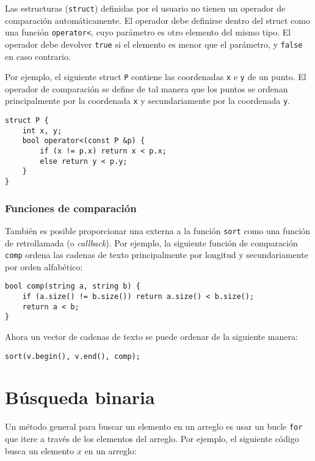 Las estructuras (\texttt{struct}) definidas por el usuario
no tienen un operador de comparación
automáticamente.
El operador debe definirse dentro
del struct como una función
\texttt{operator<},
cuyo parámetro es otro elemento del mismo tipo.
El operador debe devolver \texttt{true}
si el elemento es menor que el parámetro,
y \texttt{false} en caso contrario.

Por ejemplo, el siguiente struct \texttt{P}
contiene las coordenadas \texttt{x} e \texttt{y} de un punto.
El operador de comparación se define de tal manera que
los puntos se ordenan principalmente por la coordenada \texttt{x}
y secundariamente por la coordenada \texttt{y}.

\begin{lstlisting}
struct P {
    int x, y;
    bool operator<(const P &p) {
        if (x != p.x) return x < p.x;
        else return y < p.y;
    }
}
\end{lstlisting}

\subsubsection{Funciones de comparación}


También es posible proporcionar una
 externa a la función \texttt{sort}
como una función de retrollamada (o \textit{callback}).
Por ejemplo, la siguiente función de comparación \texttt{comp}
ordena las cadenas de texto principalmente por longitud y secundariamente
por orden alfabético:

\begin{lstlisting}
bool comp(string a, string b) {
    if (a.size() != b.size()) return a.size() < b.size();
    return a < b;
}
\end{lstlisting}
Ahora un vector de cadenas de texto se puede ordenar de la siguiente manera:
\begin{lstlisting}
sort(v.begin(), v.end(), comp);
\end{lstlisting}

\section{Búsqueda binaria}


Un método general para buscar un elemento
en un arreglo es usar un bucle \texttt{for}
que itere a través de los elementos del arreglo.
Por ejemplo, el siguiente código busca
un elemento $x$ en un arreglo:

